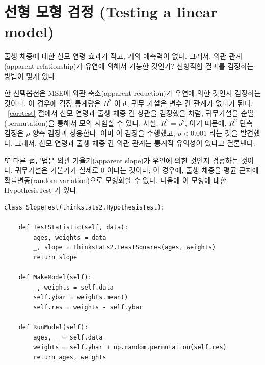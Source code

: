 

\section{선형 모형 검정 (Testing a linear model)}

출생 체중에 대한 산모 연령 효과가 작고, 거의 예측력이 없다.
그래서, 외관 관계(apparent relationship)가 유연에 의해서 가능한 것인가?
선형적합 결과를 검정하는 방법이 몇개 있다.

한 선택옵션은 MSE에 외관 축소(apparent reduction)가 우연에 의한 것인지 검정하는 것이다. 이 경우에 검정 통계량은 $R^2$ 이고, 귀무 가설은 변수 간 관계가 없다가 된다. ~\ref{corrtest} 절에서 산모 연령과 출생 체중 간 상관을 검정했을 처럼, 귀무가설을 순열(permutation)을 통해서 모의 시험할 수 있다. 사실, $R^2 = \rho^2$, 이기 때문에, $R^2$ 단측 검정은 $\rho$ 양측 검정과 상응한다. 이미 이 검정을 수행했고, $p < 0.001$ 라는 것을 발견했다. 그래서, 산모 연령과 출생 체중 간 외관 관계는 통계적 유의성이 있다고 결론낸다.


또 다른 접근법은 외관 기울기(apparent slope)가 우연에 의한 것인지 검정하는 것이다. 귀무가설은 기울기가 실제로 0 이다는 것이다; 이 경우에, 출생 체중을 평균 근처에 확률변동(random variation)으로 모형화할 수 있다. 다음에 이 모형에 대한 HypothesisTest 가 있다.

\begin{verbatim}
class SlopeTest(thinkstats2.HypothesisTest):

    def TestStatistic(self, data):
        ages, weights = data
        _, slope = thinkstats2.LeastSquares(ages, weights)
        return slope

    def MakeModel(self):
        _, weights = self.data
        self.ybar = weights.mean()
        self.res = weights - self.ybar

    def RunModel(self):
        ages, _ = self.data
        weights = self.ybar + np.random.permutation(self.res)
        return ages, weights
\end{verbatim}

